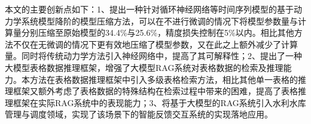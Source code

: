 本文的主要创新点如下：1、提出一种针对循环神经网络等时间序列模型的基于动力学系统模型降阶的模型压缩方法，可以在不进行微调的情况下将模型参数量与计算量分别压缩至原始模型的34.4\%与25.6\%，精度损失控制在5\%以内。相比其他方法不仅在无微调的情况下更有效地压缩了模型参数，又在此之上额外减少了计算量。同时将传统动力学方法引入神经网络中，提高了其可解释性；2、提出了一种大模型表格数据推理框架，增强了大模型RAG系统对表格数据的检索及推理能力。本方法在表格数据推理框架中引入多级表格检索方法，相比其他单一表格的推理框架又额外考虑了表格数据的特殊结构在检索过程中带来的困难，提高了表格推理框架在实际RAG系统中的表现能力；3、将基于大模型的RAG系统引入水利水库管理与调度领域，实现了该场景下的智能反馈交互系统的实现落地应用。
\label{sec:first}












